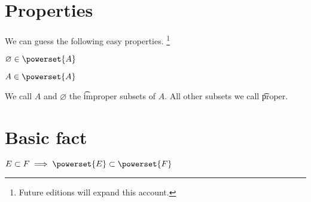 \section*{Properties}

We can guess the following easy properties.
    \ifhmode\unskip\fi\footnote{
Future editions will expand this account.
    }

\begin{proposition}
$\varnothing \in \powerset{A}$\end{proposition}
\begin{proposition}
$A \in \powerset{A}$\end{proposition}
We call $A$ and $\varnothing$ the \t{improper} subsets of $A$.
All other subsets we call \t{proper}.

\section*{Basic fact}

\begin{proposition}
$E \subset F \implies \powerset{E} \subset \powerset{F}$\end{proposition}